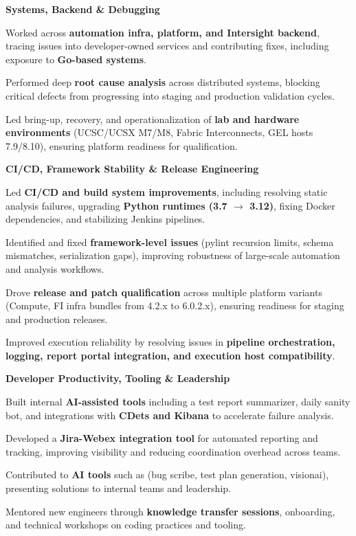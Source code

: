 \documentclass[10pt]{article}
\begin{document}
\quad \textbf{Systems, Backend \& Debugging}
\begin{compactitem}
\item Worked across \textbf{automation infra, platform, and Intersight backend}, tracing issues into developer-owned services and contributing fixes, including exposure to \textbf{Go-based systems}.
\item Performed deep \textbf{root cause analysis} across distributed systems, blocking critical defects from progressing into staging and production validation cycles.
\item Led bring-up, recovery, and operationalization of \textbf{lab and hardware environments} (UCSC/UCSX M7/M8, Fabric Interconnects, GEL hosts 7.9/8.10), ensuring platform readiness for qualification.
\end{compactitem}

\quad \textbf{CI/CD, Framework Stability \& Release Engineering}
\begin{compactitem}
\item Led \textbf{CI/CD and build system improvements}, including resolving static analysis failures, upgrading \textbf{Python runtimes (3.7 $\rightarrow$ 3.12)}, fixing Docker dependencies, and stabilizing Jenkins pipelines.
\item Identified and fixed \textbf{framework-level issues} (pylint recursion limits, schema mismatches, serialization gaps), improving robustness of large-scale automation and analysis workflows.
\item Drove \textbf{release and patch qualification} across multiple platform variants (Compute, FI infra bundles from 4.2.x to 6.0.2.x), ensuring readiness for staging and production releases.
\item Improved execution reliability by resolving issues in \textbf{pipeline orchestration, logging, report portal integration, and execution host compatibility}.
\end{compactitem}

\quad \textbf{Developer Productivity, Tooling \& Leadership}
\begin{compactitem}
\item Built internal \textbf{AI-assisted tools} including a test report summarizer, daily sanity bot, and integrations with \textbf{CDets and Kibana} to accelerate failure analysis.
\item Developed a \textbf{Jira-Webex integration tool} for automated reporting and tracking, improving visibility and reducing coordination overhead across teams.
\item Contributed to \textbf{AI tools} such as (bug scribe, test plan generation, visionai), presenting solutions to internal teams and leadership.
\item Mentored new engineers through \textbf{knowledge transfer sessions}, onboarding, and technical workshops on coding practices and tooling.
\end{compactitem}
\end{document}
